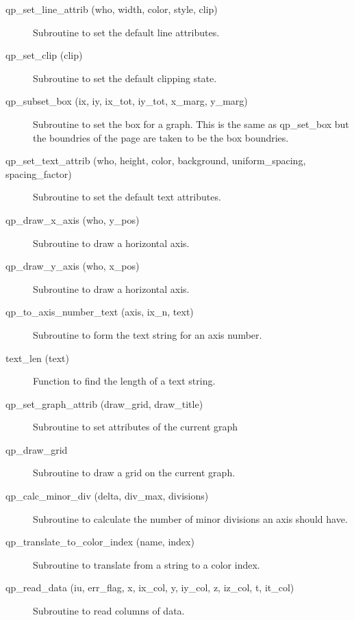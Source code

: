 \begin{description}
\item[qp\_set\_line\_attrib (who, width, color, style, clip)] \Newline 
     Subroutine to set the default line attributes.

\item[qp\_set\_clip (clip)] \Newline 
     Subroutine to set the default clipping state.

\item[qp\_subset\_box (ix, iy, ix\_tot, iy\_tot, x\_marg, y\_marg)] \Newline 
     Subroutine to set the box for a graph. This is the same as
     qp\_set\_box but the boundries of the page are taken to be the box boundries.

\item[qp\_set\_text\_attrib (who, height, color, background, 
                                      uniform\_spacing, spacing\_factor) ] \Newline 
     Subroutine to set the default text attributes.

\item[qp\_draw\_x\_axis (who, y\_pos)] \Newline 
     Subroutine to draw a horizontal axis.

\item[qp\_draw\_y\_axis (who, x\_pos)] \Newline 
     Subroutine to draw a horizontal axis.

\item[qp\_to\_axis\_number\_text (axis, ix\_n, text)] \Newline 
     Subroutine to form the text string for an axis number.

\item[text\_len (text)] \Newline 
     Function to find the length of a text string.

\item[qp\_set\_graph\_attrib (draw\_grid, draw\_title)] \Newline 
     Subroutine to set attributes of the current graph

\item[qp\_draw\_grid] \Newline 
     Subroutine to draw a grid on the current graph.

\item[qp\_calc\_minor\_div (delta, div\_max, divisions)] \Newline 
     Subroutine to calculate the number of minor divisions an axis should have.

\item[qp\_translate\_to\_color\_index (name, index)] \Newline 
     Subroutine to translate from a string to a color index.

\item[qp\_read\_data (iu, err\_flag, x, ix\_col, y, iy\_col, z, iz\_col, 
                                                               t, it\_col) ] \Newline 
     Subroutine to read columns of data.

\end{description}

